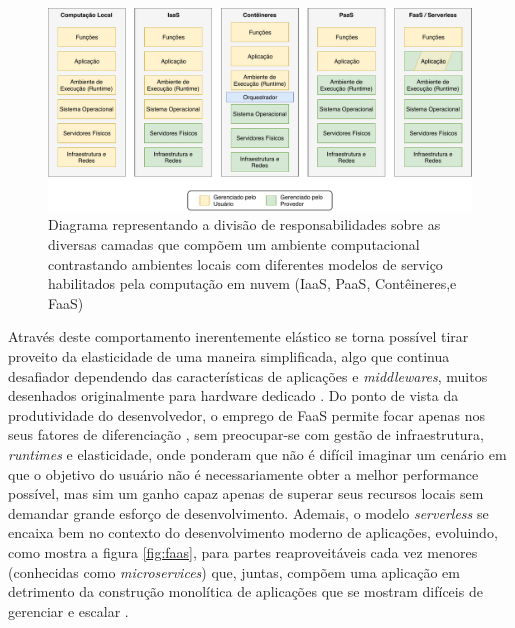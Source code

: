 \documentclass[english,brazilian]{UNISINOSmonografia} %
\newcommand\defaultFigureWidth{0.9}
\begin{document}
\begin{figure}[tb]
	\centering%
	\begin{minipage}{\defaultFigureWidth\textwidth}
		\caption{Diagrama representando a divisão de responsabilidades sobre as diversas camadas que compõem um ambiente computacional contrastando ambientes locais com diferentes modelos de serviço habilitados pela computação em nuvem (IaaS, PaaS, Contêineres,e FaaS)}
		\label{fig:faas}
		\vspace{1ex}
		\includegraphics[clip,width=\textwidth]{mestrado-faas}
	\end{minipage}
\end{figure}



Através deste comportamento inerentemente elástico se torna possível tirar proveito da elasticidade de uma maneira simplificada, algo que continua desafiador dependendo das características de aplicações e \textit{middlewares}, muitos desenhados originalmente para hardware dedicado \cite{Jonas2017}.
Do ponto de vista da produtividade do desenvolvedor, o emprego de FaaS permite focar apenas nos seus fatores de diferenciação \cite{BoweiHan}, sem preocupar-se com gestão de infraestrutura, \textit{runtimes} e elasticidade, onde  ponderam que não é difícil imaginar um cenário em que o objetivo do usuário não é necessariamente obter a melhor performance possível, mas sim um ganho capaz apenas de superar seus recursos locais sem demandar grande esforço de desenvolvimento.
Ademais, o modelo \textit{serverless} se encaixa bem no contexto do desenvolvimento moderno de aplicações, evoluindo, como mostra a figura \autoref{fig:faas}, para partes reaproveitáveis cada vez menores (conhecidas como \textit{microservices}) que, juntas, compõem uma aplicação em detrimento da construção monolítica de aplicações que se mostram difíceis de gerenciar e escalar \cite{Eivy2017}.
\end{document}
